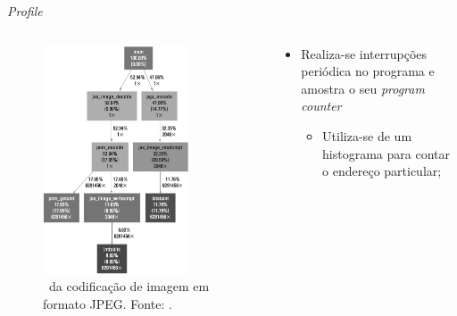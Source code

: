    \begin{frame}{\textit{Profile}} \vspace{-1em}
      
      \begin{columns}
         \begin{column}{0.5\textwidth}
            
            \begin{figure}[h] \centering
               \vspace{-24pt}
               \includegraphics[width=0.8\textwidth]{img/f4-1-2.png}
               \caption{\Profile\ da codificação de imagem em formato JPEG. Fonte: \cite{Sass2010}.}
            \end{figure}
         \end{column}
         \begin{column}{0.5\textwidth}
            \vspace{-1cm}
            \begin{itemize}
               \setlength{\itemsep}{1.5em}
               \item Realiza-se interrupções periódica no programa e amostra o seu \textit{program counter}
               \begin{itemize}
                  \setlength{\itemsep}{1em}
                  \item Utiliza-se de um histograma para contar o endereço particular;
                  

\end{itemize}
\end{itemize}
\end{column}
\end{columns}
\end{frame}
